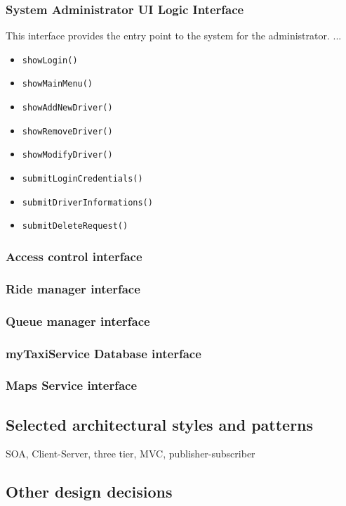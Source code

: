 \subsubsection{System Administrator UI Logic Interface}
This interface provides the entry point to the system for the administrator.
...
\begin{itemize}
	\item \texttt{showLogin()}
	\item \texttt{showMainMenu()}
	\item \texttt{showAddNewDriver()}
	\item \texttt{showRemoveDriver()}
	\item \texttt{showModifyDriver()}
	\item \texttt{submitLoginCredentials()}
	\item \texttt{submitDriverInformations()}
	\item \texttt{submitDeleteRequest()}
\end{itemize}
\subsubsection{Access control interface}
\subsubsection{Ride manager interface}
\subsubsection{Queue manager interface}
\subsubsection{myTaxiService Database interface}
\subsubsection{Maps Service interface}
\subsection{Selected architectural styles and patterns}
SOA, Client-Server, three tier, MVC, publisher-subscriber
\subsection{Other design decisions}